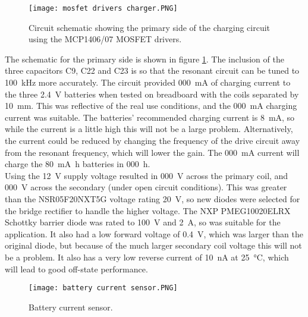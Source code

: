 \begin{figure}[htbp]
	\centering
	\texttt{[image: mosfet drivers charger.PNG]}
	\caption{Circuit schematic showing the primary side of the charging circuit using the MCP1406/07 MOSFET drivers.}
	\label{fig: mosfet drivers charger}
\end{figure}

 
The schematic for the primary side is shown in figure \ref{fig: mosfet drivers charger}. The inclusion of the three capacitors C9, C22 and C23 is so that the resonant circuit can be tuned to \SI{100}{\kilo\hertz} more accurately. The circuit provided \SI{000}{\milli\ampere} of charging current to the three \SI{2.4}{\volt} batteries when tested on breadboard with the coils separated by \SI{10}{\milli\metre}. This was reflective of the real use conditions, and the \SI{000}{\milli\ampere} charging current was suitable. The batteries' recommended charging current is \SI{8}{\milli\ampere}, so while the current is a little high this will not be a large problem. Alternatively, the current could be reduced by changing the frequency of the drive circuit away from the resonant frequency, which will lower the gain. The \SI{000}{\milli\ampere} current will charge the \SI{80}{\milli\ampere\hour} batteries in \SI{000}{\hour}.\\

Using the \SI{12}{\volt} supply voltage resulted in \SI{000}{\volt} across the primary coil, and \SI{000}{\volt} across the secondary (under open circuit conditions). This was greater than the NSR05F20NXT5G voltage rating \SI{20}{\volt}, so new diodes were selected for the bridge rectifier to handle the higher voltage. The NXP PMEG10020ELRX Schottky barrier diode \cite{new_diode} was rated to \SI{100}{\volt} and \SI{2}{\ampere}, so was suitable for the application. It also had a low forward voltage of \SI{0.4}{\volt}, which was larger than the original diode, but because of the much larger secondary coil voltage this will not be a problem. It also has a very low reverse current of \SI{10}{\nano\ampere} at \SI{25}{\celsius}, which will lead to good off-state performance.\\




\begin{figure}[htbp]
	\centering
	\texttt{[image: battery current sensor.PNG]}
	\caption{Battery current sensor.}
	\label{fig: battery current sensor}
\end{figure}

